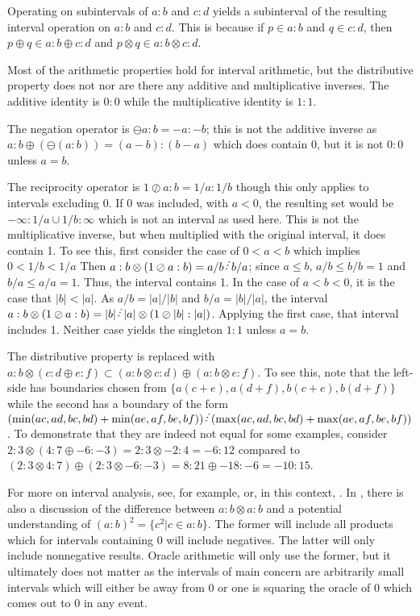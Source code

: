 \documentclass[12pt]{article}
\begin{document}
 Operating on subintervals of $a:b$ and $c:d$ yields a subinterval of the resulting interval operation on $a:b$ and $c:d$. This is because if $p \in a:b$ and $q \in c:d$, then $p \oplus q \in a:b \oplus c:d$ and $p \otimes q \in a:b \otimes c:d$. 

Most of the arithmetic properties hold for interval arithmetic, but the distributive property does not nor are there any additive and multiplicative inverses. The additive identity is $0:0$ while the multiplicative identity is $1:1$.

The negation operator is $\ominus a:b  = -a:-b$; this is not the additive inverse as $a:b \oplus (\ominus(a :b )) = (a-b):(b-a)$ which does contain 0, but it is not $0:0$ unless $a = b$. 

The reciprocity operator is $1 \oslash a:b = 1/a : 1/b$ though this only applies to intervals excluding 0. If 0 was included, with $a < 0$, the resulting set would be $-\infty:1/a \cup 1/b : \infty $ which is not an interval as used here. This is not the multiplicative inverse, but when multiplied with the original interval, it does contain 1. To see this, first consider the case of $0 \lt a \lt b$ which implies $0 \lt 1/b \lt 1/a$ Then $a:b \otimes (1 \oslash a:b) = a/b \lte b/a$; since $a \leq b$, $a /b \leq b/b =1 $ and $b/a \leq a/a = 1$. Thus, the interval contains 1. In the case of $a \lt b \lt 0$, it is the case that $|b| < |a|$. As $a/b = |a|/|b|$ and $b/a = |b|/|a|$, the interval $a:b \otimes (1 \oslash a:b) = |b| \lte |a| \otimes (1 \oslash |b|:|a|)$. Applying the first case, that interval includes 1. Neither case yields the singleton $1:1$ unless $a=b$. 

The distributive property is replaced with $ a:b \otimes ( c:d \oplus e:f) \subset (a:b \otimes c:d) \oplus (a:b \otimes e:f)$. To see this, note that the left-side has boundaries chosen from $\{a(c+e), a(d+f), b(c+e), b(d+f)\}$ while the second has a boundary of the form $(\min(ac, ad, bc, bd) + \min(ae, af, be, bf) ) \lte (\max(ac, ad, bc, bd) + \max(ae, af, be, bf) )$. To demonstrate that they are indeed not equal for some examples, consider $2:3 \otimes ( 4:7 \oplus -6:-3) = 2:3 \otimes -2:4 = -6:12$ compared to $(2:3 \otimes 4:7) \oplus (2:3 \otimes -6:-3) = 8:21 \oplus -18:-6 = -10:15$. 

For more on interval analysis, see, for example, \cite{moore} or, in this context, \cite{taylor23main}. In \cite{moore}, there is also a discussion of the difference between $a:b \otimes a:b$ and a potential understanding of $(a:b)^2 = \{c^2 | c \in a:b\}$. The former will include all products which for intervals containing 0 will include negatives. The latter will only include nonnegative results. Oracle arithmetic will only use the former, but it ultimately does not matter as the intervals of main concern are arbitrarily small intervals which will either be away from 0 or one is squaring the oracle of 0 which comes out to 0 in any event.  
\end{document}
